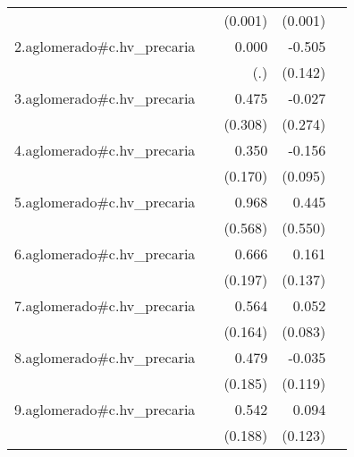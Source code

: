 {\begin{longtable}{l*{4}{D{.}{.}{-1}}}
            &                     &     (0.001)         &     (0.001)         &                     \\
\addlinespace
2.aglomerado#c.hv\_precaria&                     &       0.000         &      -0.505\sym{***}&                     \\
            &                     &         (.)         &     (0.142)         &                     \\
\addlinespace
3.aglomerado#c.hv\_precaria&                     &       0.475         &      -0.027         &                     \\
            &                     &     (0.308)         &     (0.274)         &                     \\
\addlinespace
4.aglomerado#c.hv\_precaria&                     &       0.350\sym{*}  &      -0.156         &                     \\
            &                     &     (0.170)         &     (0.095)         &                     \\
\addlinespace
5.aglomerado#c.hv\_precaria&                     &       0.968         &       0.445         &                     \\
            &                     &     (0.568)         &     (0.550)         &                     \\
\addlinespace
6.aglomerado#c.hv\_precaria&                     &       0.666\sym{***}&       0.161         &                     \\
            &                     &     (0.197)         &     (0.137)         &                     \\
\addlinespace
7.aglomerado#c.hv\_precaria&                     &       0.564\sym{***}&       0.052         &                     \\
            &                     &     (0.164)         &     (0.083)         &                     \\
\addlinespace
8.aglomerado#c.hv\_precaria&                     &       0.479\sym{**} &      -0.035         &                     \\
            &                     &     (0.185)         &     (0.119)         &                     \\
\addlinespace
9.aglomerado#c.hv\_precaria&                     &       0.542\sym{**} &       0.094         &                     \\
            &                     &     (0.188)         &     (0.123)         &                     \\

\end{longtable}}
